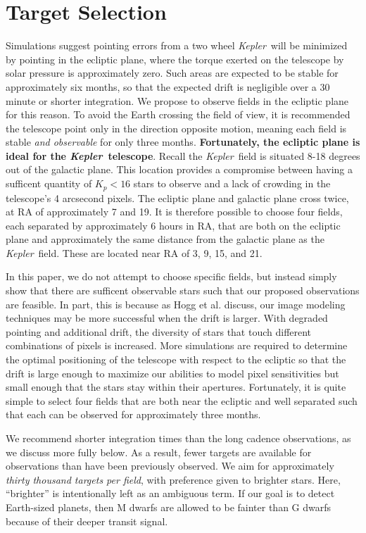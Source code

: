 \documentclass[12pt, preprint]{aastex}
\newcommand{\observatory}[1]{\textsl{#1}}
\newcommand{\kepler}{\observatory{Kepler}}
\newcommand{\Kepler}{\kepler}
\begin{document}
\section{Target Selection}
\label{Targets}
Simulations suggest pointing errors from a two wheel \Kepler\ will be 
 minimized by pointing in the ecliptic plane, where the torque exerted on 
 the telescope by solar pressure is approximately zero. 
Such areas are expected to be stable for approximately six months, so that the 
 expected drift is negligible over a 30 minute or shorter integration.
We propose to observe fields in the ecliptic plane for this reason. 
To avoid the Earth crossing the field of view, it is recommended the telescope
 point only in the direction opposite motion, meaning each field is stable 
 \emph{and observable} for only three months.
\textbf{Fortunately, the ecliptic plane is ideal for the \Kepler\ telescope}.
Recall the \Kepler\ field is situated 8-18 degrees out of the galactic plane.
This location provides a compromise between having a sufficent quantity of 
 $K_p < 16$ stars to observe and a lack of crowding in the telescope's 4 
 arcsecond pixels. 
The ecliptic plane and galactic plane cross twice, at RA of approximately
 7 and 19. 
It is therefore possible to choose four fields, each separated by
 approximately 6 hours in RA, that are both on the ecliptic plane and
 approximately the same distance from the galactic plane as the \Kepler\
 field. 
These are located near RA of 3, 9, 15, and 21. 

In this paper, we do not attempt to choose specific fields, but instead
 simply show that there are sufficent observable stars such that our proposed
 observations are feasible.
In part, this is because as Hogg et al. discuss, our image modeling techniques
 may be more successful when the drift is larger. 
With degraded pointing and additional drift, the diversity of stars that touch
 different combinations of pixels is increased. 
More simulations are required to determine the optimal positioning of the 
 telescope with respect to the ecliptic so that the drift is large enough 
 to maximize our abilities to model pixel sensitivities but small enough 
 that the stars stay within their apertures.
Fortunately, it is quite simple to select four fields that are both near the 
 ecliptic and well separated such that each can be observed for approximately
 three months.

We recommend shorter integration times than the long cadence observations, 
 as we discuss more fully below. 
As a result, fewer targets are available for observations than have been 
 previously observed. 
We aim for approximately \emph{thirty thousand targets per field}, with 
 preference given to brighter stars. 
Here, ``brighter'' is intentionally left as an ambiguous term. If our goal is to detect Earth-sized planets, then M dwarfs are allowed
 to be fainter than G dwarfs because of their deeper transit signal. 
\end{document}
